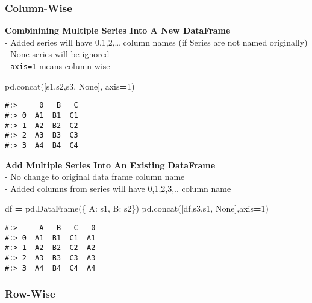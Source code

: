 \documentclass[
]{book}
\newenvironment{Shaded}{\begin{snugshade}}{\end{snugshade}}
\newcommand{\DecValTok}[1]{\textcolor[rgb]{0.06,0.06,0.06}{#1}}
\newcommand{\NormalTok}[1]{#1}
\newcommand{\OperatorTok}[1]{\textcolor[rgb]{0.43,0.43,0.43}{\textbf{#1}}}
\newcommand{\StringTok}[1]{\textcolor[rgb]{0.5,0.5,0.5}{#1}}
\newcommand{\VariableTok}[1]{\textcolor[rgb]{0,0,0}{#1}}
\begin{document}
\hypertarget{column-wise}{%
\subsubsection{Column-Wise}\label{column-wise}}

\textbf{Combinining Multiple Series Into A New DataFrame}\\
- Added series will have 0,1,2,\ldots{} column names (if Series are not named originally)\\
- None series will be ignored\\
- \texttt{axis=1} means column-wise

\begin{Shaded}
\begin{Highlighting}[]
\NormalTok{pd.concat([s1,s2,s3, }\VariableTok{None}\NormalTok{], axis}\OperatorTok{=}\DecValTok{1}\NormalTok{)}
\end{Highlighting}
\end{Shaded}

\begin{verbatim}
#:>     0   B   C
#:> 0  A1  B1  C1
#:> 1  A2  B2  C2
#:> 2  A3  B3  C3
#:> 3  A4  B4  C4
\end{verbatim}

\textbf{Add Multiple Series Into An Existing DataFrame}\\
- No change to original data frame column name\\
- Added columns from series will have 0,1,2,3,.. column name

\begin{Shaded}
\begin{Highlighting}[]
\NormalTok{df }\OperatorTok{=}\NormalTok{ pd.DataFrame(\{ }\StringTok{\textquotesingle{}A\textquotesingle{}}\NormalTok{: s1, }\StringTok{\textquotesingle{}B\textquotesingle{}}\NormalTok{: s2\})}
\NormalTok{pd.concat([df,s3,s1, }\VariableTok{None}\NormalTok{],axis}\OperatorTok{=}\DecValTok{1}\NormalTok{)}
\end{Highlighting}
\end{Shaded}

\begin{verbatim}
#:>     A   B   C   0
#:> 0  A1  B1  C1  A1
#:> 1  A2  B2  C2  A2
#:> 2  A3  B3  C3  A3
#:> 3  A4  B4  C4  A4
\end{verbatim}

\hypertarget{row-wise}{%
\subsubsection{Row-Wise}\label{row-wise}}
\end{document}
